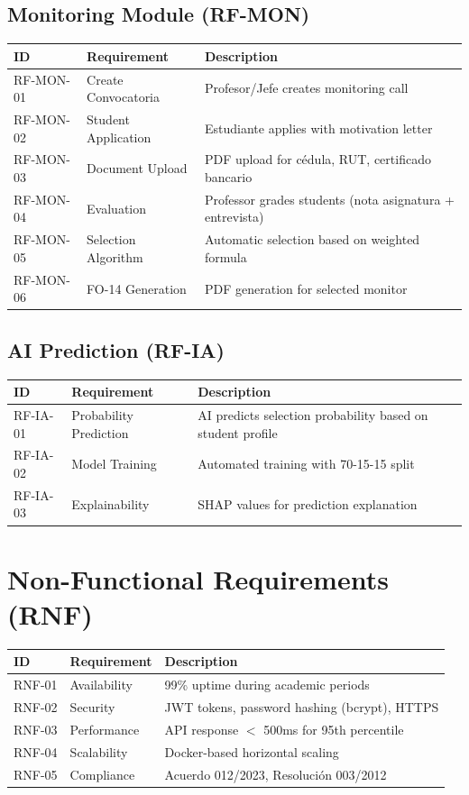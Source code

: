 \documentclass[12pt,a4paper]{report}
\begin{document}
\subsection{Monitoring Module (RF-MON)}
\begin{longtable}{|p{2cm}|p{4cm}|p{7cm}|}
\hline
\textbf{ID} & \textbf{Requirement} & \textbf{Description} \\
\hline
\endfirsthead
RF-MON-01 & Create Convocatoria & Profesor/Jefe creates monitoring call \\
\hline
RF-MON-02 & Student Application & Estudiante applies with motivation letter \\
\hline
RF-MON-03 & Document Upload & PDF upload for cédula, RUT, certificado bancario \\
\hline
RF-MON-04 & Evaluation & Professor grades students (nota asignatura + entrevista) \\
\hline
RF-MON-05 & Selection Algorithm & Automatic selection based on weighted formula \\
\hline
RF-MON-06 & FO-14 Generation & PDF generation for selected monitor \\
\hline
\end{longtable}

\subsection{AI Prediction (RF-IA)}
\begin{longtable}{|p{2cm}|p{4cm}|p{7cm}|}
\hline
\textbf{ID} & \textbf{Requirement} & \textbf{Description} \\
\hline
\endfirsthead
RF-IA-01 & Probability Prediction & AI predicts selection probability based on student profile \\
\hline
RF-IA-02 & Model Training & Automated training with 70-15-15 split \\
\hline
RF-IA-03 & Explainability & SHAP values for prediction explanation \\
\hline
\end{longtable}

\section{Non-Functional Requirements (RNF)}

\begin{longtable}{|p{2cm}|p{4cm}|p{7cm}|}
\hline
\textbf{ID} & \textbf{Requirement} & \textbf{Description} \\
\hline
\endfirsthead
RNF-01 & Availability & 99\% uptime during academic periods \\
\hline
RNF-02 & Security & JWT tokens, password hashing (bcrypt), HTTPS \\
\hline
RNF-03 & Performance & API response $<$ 500ms for 95th percentile \\
\hline
RNF-04 & Scalability & Docker-based horizontal scaling \\
\hline
RNF-05 & Compliance & Acuerdo 012/2023, Resolución 003/2012 \\
\hline
\end{longtable}
\end{document}
